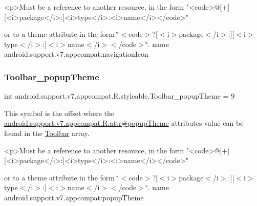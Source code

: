 \begin{DoxyVerb}      <p>Must be a reference to another resource, in the form "<code>@[+][<i>package</i>:]<i>type</i>:<i>name</i></code>"
\end{DoxyVerb}
 or to a theme attribute in the form \char`\"{}$<$code$>$?\mbox{[}$<$i$>$package$<$/i$>$\+:\mbox{]}\mbox{[}$<$i$>$type$<$/i$>$\+:\mbox{]}$<$i$>$name$<$/i$>$$<$/code$>$\char`\"{}.  name android.\+support.\+v7.\+appcompat\+:navigation\+Icon \mbox{\label{classandroid_1_1support_1_1v7_1_1appcompat_1_1R_1_1styleable_aa37388b9b7ea40ceaabc9534f732ee00}} 
\subsubsection{\texorpdfstring{Toolbar\+\_\+popup\+Theme}{Toolbar\_popupTheme}}
{\footnotesize\ttfamily int android.\+support.\+v7.\+appcompat.\+R.\+styleable.\+Toolbar\+\_\+popup\+Theme = 9\hspace{0.3cm}{\ttfamily [static]}}

This symbol is the offset where the \hyperlink{classandroid_1_1support_1_1v7_1_1appcompat_1_1R_1_1attr_a7163bdfa188237fc5f6cb7ec583125e4}{android.\+support.\+v7.\+appcompat.\+R.\+attr\#popup\+Theme} attribute\textquotesingle{}s value can be found in the \hyperlink{classandroid_1_1support_1_1v7_1_1appcompat_1_1R_1_1styleable_a2daba9587ef9f700f2d54cf13435cb32}{Toolbar} array.

\begin{DoxyVerb}      <p>Must be a reference to another resource, in the form "<code>@[+][<i>package</i>:]<i>type</i>:<i>name</i></code>"
\end{DoxyVerb}
 or to a theme attribute in the form \char`\"{}$<$code$>$?\mbox{[}$<$i$>$package$<$/i$>$\+:\mbox{]}\mbox{[}$<$i$>$type$<$/i$>$\+:\mbox{]}$<$i$>$name$<$/i$>$$<$/code$>$\char`\"{}.  name android.\+support.\+v7.\+appcompat\+:popup\+Theme \mbox{\label{classandroid_1_1support_1_1v7_1_1appcompat_1_1R_1_1styleable_a2cbf4193bb5275277f1f000819d09790}} 
